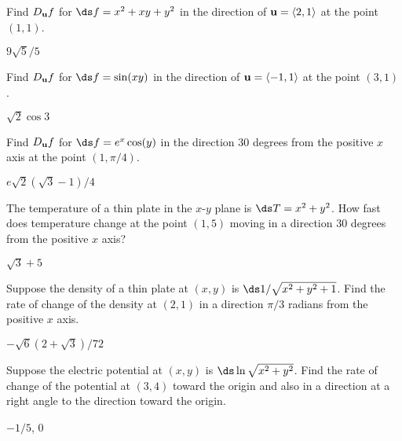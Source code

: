 \begin{exercises}

\begin{exercise} Find $D_{\bf u} f$ for 
$\ds f=x^2+xy+y^2$ in the direction of ${\bf u}=\langle 2,1\rangle$ 
at the point $(1,1)$.
\begin{answer} $9\sqrt5/5$
\end{answer}\end{exercise}

\begin{exercise} Find $D_{\bf u} f$ for 
$\ds f=\sin(xy)$ in the direction of ${\bf u}=\langle -1,1\rangle$ 
at the point $(3,1)$.
\begin{answer} $\sqrt2\cos3$
\end{answer}\end{exercise}

\begin{exercise} Find $D_{\bf u} f$ for 
$\ds f=e^x\cos(y)$ in the direction 30 degrees from the positive $x$ axis
at the point $(1,\pi/4)$.
\begin{answer} $e\sqrt2(\sqrt3-1)/4$
\end{answer}\end{exercise}

\begin{exercise} The temperature of a thin plate in the $x$-$y$ plane is 
$\ds T=x^2+y^2$. How fast does temperature change at the point $(1,5)$
moving in a direction 30 degrees from the positive $x$ axis?
\begin{answer} $\sqrt3+5$
\end{answer}\end{exercise}

\begin{exercise} Suppose the density of a thin plate at $(x,y)$ is
$\ds 1/\sqrt{x^2+y^2+1}$. Find the rate of change of the density at
$(2,1)$ in a direction $\pi/3$ radians from the positive $x$ axis.
\begin{answer} $-\sqrt6(2+\sqrt3)/72$
\end{answer}\end{exercise}

\begin{exercise} Suppose the electric potential at $(x,y)$ is
$\ds\ln\sqrt{x^2+y^2}$. Find the rate of change of the potential at
$(3,4)$ toward the origin and also in a direction at a right angle to
the direction toward the origin.
\begin{answer} $-1/5$, $0$
\end{answer}\end{exercise}


\end{exercises}

